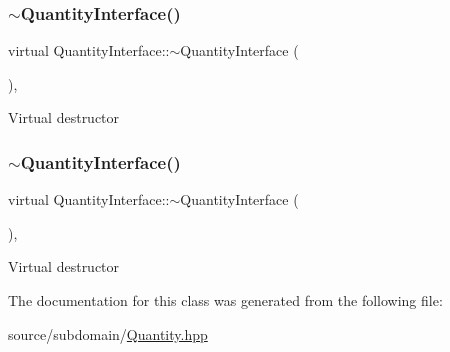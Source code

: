 \subsubsection{\texorpdfstring{$\sim$\+Quantity\+Interface()}{~QuantityInterface()}\hspace{0.1cm}{\footnotesize\ttfamily [1/2]}}
{\footnotesize\ttfamily virtual Quantity\+Interface\+::$\sim$\+Quantity\+Interface (\begin{DoxyParamCaption}{ }\end{DoxyParamCaption})\hspace{0.3cm}{\ttfamily [inline]}, {\ttfamily [virtual]}}

Virtual destructor \mbox{\label{classQuantityInterface_acb39ddd398f6d615f28051bb32c25bbe}} 
\subsubsection{\texorpdfstring{$\sim$\+Quantity\+Interface()}{~QuantityInterface()}\hspace{0.1cm}{\footnotesize\ttfamily [2/2]}}
{\footnotesize\ttfamily virtual Quantity\+Interface\+::$\sim$\+Quantity\+Interface (\begin{DoxyParamCaption}{ }\end{DoxyParamCaption})\hspace{0.3cm}{\ttfamily [inline]}, {\ttfamily [virtual]}}

Virtual destructor 

The documentation for this class was generated from the following file\+:\begin{DoxyCompactItemize}
\item 
source/subdomain/\hyperlink{source_2subdomain_2Quantity_8hpp}{Quantity.\+hpp}\end{DoxyCompactItemize}
